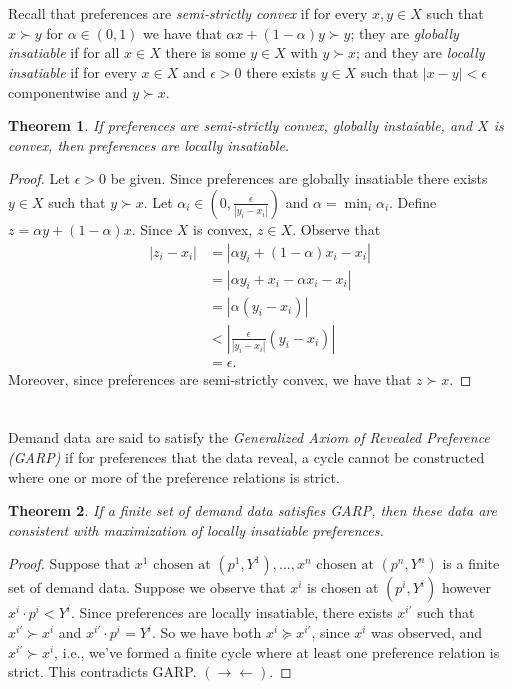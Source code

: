 \documentclass[12pt]{article}
\newtheorem{thm}{Theorem}[section]
\theoremstyle{definition}
\theoremstyle{remark}
\def\contra{\rightarrow \leftarrow}
\newcommand{\abs}[1]{\left\vert#1\right\vert}
\begin{document}
\section{}
Recall that preferences are \emph{semi-strictly convex} if for every $x, y \in X$ such that $x \succ y$ for $\alpha \in (0,1)$ we have that $\alpha x + (1-\alpha)y \succ y$; they are \emph{globally insatiable} if for all $x \in X$ there is some $y \in X$ with $y \succ x$; and they are \emph{locally insatiable} if for every $x \in X$ and $\epsilon > 0$ there exists $y \in X$
such that $\abs{x-y} < \epsilon$ componentwise and $y \succ x$.
\begin{thm}
  If preferences are semi-strictly convex, globally instaiable, and $X$ is convex, then preferences are locally insatiable.
\end{thm}
\begin{proof}
  Let $\epsilon > 0$ be given. Since preferences are globally insatiable there exists $y \in X$ such that $y \succ x$. Let $\alpha_i \in (0, \frac{\epsilon}{\abs{y_i - x_i}})$ and $\alpha = \min_i \alpha_i$. Define $z = \alpha y + (1 - \alpha)x$. Since $X$ is convex, $z \in X$. Observe that
  \begin{align*}
    \abs{z_i-x_i} &= \abs{\alpha y_i + (1 - \alpha)x_i - x_i} \\
    &= \abs{\alpha y_i + x_i - \alpha x_i - x_i} \\
    &= \abs{\alpha(y_i - x_i)} \\
    &< \abs{\frac{\epsilon}{\abs{y_i - x_i}} (y_i - x_i)} \\
    &= \epsilon.
  \end{align*}
  Moreover, since preferences are semi-strictly convex, we have that $z \succ x$.
\end{proof}
%
%
\section{}
Demand data are said to satisfy the \emph{Generalized Axiom of Revealed Preference (GARP)} if for preferences that the data reveal, a cycle cannot be constructed where one or more of the preference relations is strict.
\begin{thm}
  If a finite set of demand data satisfies GARP, then these data are consistent with maximization of locally insatiable preferences.
\end{thm}
\begin{proof}
  Suppose that $x^1 \text{ chosen at } (p^1, Y^1), \ldots, x^n \text{ chosen at } (p^n, Y^n)$ is a finite set of demand data. Suppose we observe that $x^i$ is chosen at $(p^i, Y^i)$ however $x^i \cdot p^i < Y^i$. Since preferences are locally insatiable, there exists $x^{i'}$ such that $x^{i'} \succ x^i$ and $x^{i'} \cdot p^i = Y^i$. So we have both $x^i \succeq x^{i'}$, since $x^i$ was observed, and $x^{i'} \succ x^i$, i.e., we've formed a finite cycle where at least one preference relation is strict. This contradicts GARP. $(\contra)$.
\end{proof}
%
%
\end{document}

